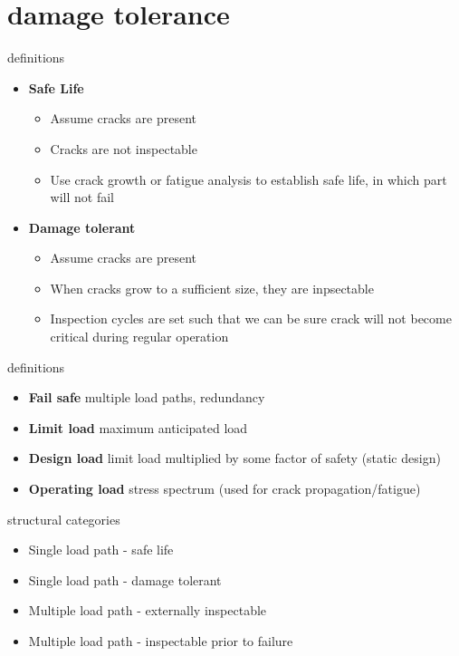 \documentclass[10pt]{beamer}
\begin{document}
	\section{damage tolerance}
	
	\begin{frame}{definitions}
		\begin{itemize}[<+->]
			\item \textbf{Safe Life}
			\begin{itemize}
				\item Assume cracks are present
				\item Cracks are not inspectable
				\item Use crack growth or fatigue analysis to establish safe life, in which part will not fail
			\end{itemize}
			\item \textbf{Damage tolerant}
			\begin{itemize}
				\item Assume cracks are present
				\item When cracks grow to a sufficient size, they are inpsectable
				\item Inspection cycles are set such that we can be sure crack will not become critical during regular operation
			\end{itemize}
		\end{itemize}
	\end{frame}
	
	\begin{frame}{definitions}
		\begin{itemize}[<+->]
			\item \textbf{Fail safe} multiple load paths, redundancy 
			\item \textbf{Limit load} maximum anticipated load
			\item \textbf{Design load} limit load multiplied by some factor of safety (static design)
			\item \textbf{Operating load} stress spectrum (used for crack propagation/fatigue)
		\end{itemize}
	\end{frame}
	
	\begin{frame}{structural categories}
		\begin{itemize}[<+->]
			\item Single load path - safe life
			\item Single load path - damage tolerant
			\item Multiple load path - externally inspectable
			\item Multiple load path - inspectable prior to failure
		\end{itemize}
	\end{frame}
	
\end{document}

